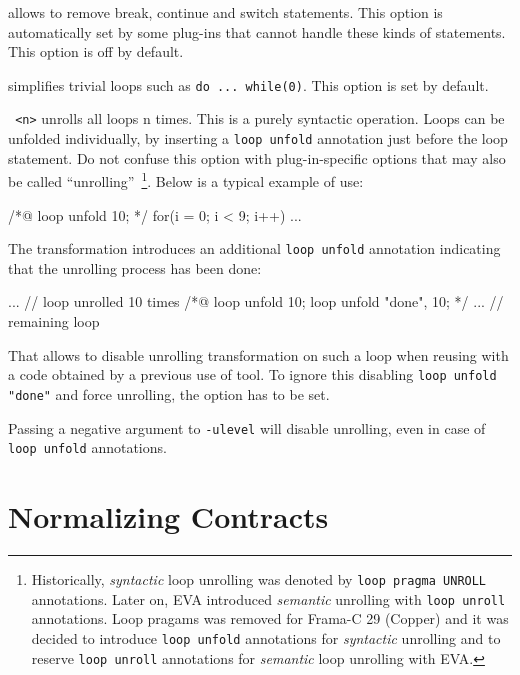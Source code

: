 \begin{description}
\item {} allows \FramaC to remove break, continue and
  switch statements. This option is automatically set by some plug-ins that
  cannot handle these kinds of statements. This option is off by default.

\item {} simplifies trivial loops such as
  \texttt{do ... while(0)}. This option is set by default.

\item \texttt{ <n>} unrolls all loops n times. This is a
  purely syntactic operation. Loops can be unfolded individually, by
  inserting a \verb+loop unfold+ annotation just before the loop statement. Do
  not confuse this option with plug-in-specific options that may also be called
  ``unrolling''~\cite{value}\footnote{
    Historically, \textit{syntactic} loop unrolling was denoted by
    \texttt{loop pragma UNROLL} annotations. Later on, \textsf{EVA} introduced
    \textit{semantic} unrolling with \texttt{loop unroll} annotations.
    Loop pragams was removed for Frama-C 29 (Copper) and it was
    decided to introduce \texttt{loop unfold} annotations for \textit{syntactic}
    unrolling and to reserve \texttt{loop unroll} annotations for \textit{semantic}
    loop unrolling with \textsf{EVA}.
  }. Below is a typical example of use:
\begin{ccode}
/*@ loop unfold 10; */
for(i = 0; i < 9; i++) ...
\end{ccode}
The transformation introduces an additional \verb+loop unfold+ annotation
indicating that the unrolling process has been done:
\begin{ccode}
... // loop unrolled 10 times
/*@ loop unfold 10;
    loop unfold "done", 10; */
  ... // remaining loop
\end{ccode}
That allows to disable unrolling transformation on such a loop when reusing
\FramaC with a code obtained by a previous use of \FramaC tool.
To ignore this disabling \verb+loop unfold "done"+ and force unrolling,
the option \texttt{} has to be set.

Passing a negative argument to \texttt{-ulevel} will disable unrolling, even
in case of \verb+loop unfold+ annotations.
\end{description}

\section{Normalizing Contracts}\label{sec:normalize-contracts}


